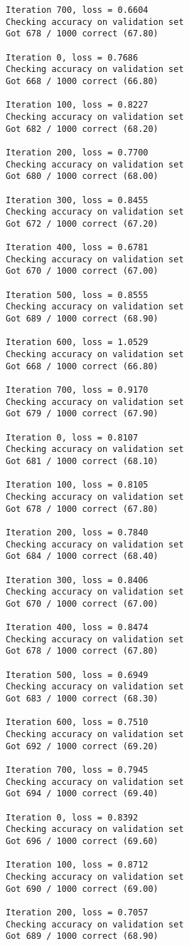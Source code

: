 \documentclass[11pt]{article}
\begin{document}
\begin{Verbatim}[commandchars=\\\{\}]
Iteration 700, loss = 0.6604
Checking accuracy on validation set
Got 678 / 1000 correct (67.80)

Iteration 0, loss = 0.7686
Checking accuracy on validation set
Got 668 / 1000 correct (66.80)

Iteration 100, loss = 0.8227
Checking accuracy on validation set
Got 682 / 1000 correct (68.20)

Iteration 200, loss = 0.7700
Checking accuracy on validation set
Got 680 / 1000 correct (68.00)

Iteration 300, loss = 0.8455
Checking accuracy on validation set
Got 672 / 1000 correct (67.20)

Iteration 400, loss = 0.6781
Checking accuracy on validation set
Got 670 / 1000 correct (67.00)

Iteration 500, loss = 0.8555
Checking accuracy on validation set
Got 689 / 1000 correct (68.90)

Iteration 600, loss = 1.0529
Checking accuracy on validation set
Got 668 / 1000 correct (66.80)

Iteration 700, loss = 0.9170
Checking accuracy on validation set
Got 679 / 1000 correct (67.90)

Iteration 0, loss = 0.8107
Checking accuracy on validation set
Got 681 / 1000 correct (68.10)

Iteration 100, loss = 0.8105
Checking accuracy on validation set
Got 678 / 1000 correct (67.80)

Iteration 200, loss = 0.7840
Checking accuracy on validation set
Got 684 / 1000 correct (68.40)

Iteration 300, loss = 0.8406
Checking accuracy on validation set
Got 670 / 1000 correct (67.00)

Iteration 400, loss = 0.8474
Checking accuracy on validation set
Got 678 / 1000 correct (67.80)

Iteration 500, loss = 0.6949
Checking accuracy on validation set
Got 683 / 1000 correct (68.30)

Iteration 600, loss = 0.7510
Checking accuracy on validation set
Got 692 / 1000 correct (69.20)

Iteration 700, loss = 0.7945
Checking accuracy on validation set
Got 694 / 1000 correct (69.40)

Iteration 0, loss = 0.8392
Checking accuracy on validation set
Got 696 / 1000 correct (69.60)

Iteration 100, loss = 0.8712
Checking accuracy on validation set
Got 690 / 1000 correct (69.00)

Iteration 200, loss = 0.7057
Checking accuracy on validation set
Got 689 / 1000 correct (68.90)


\end{Verbatim}
\end{document}
